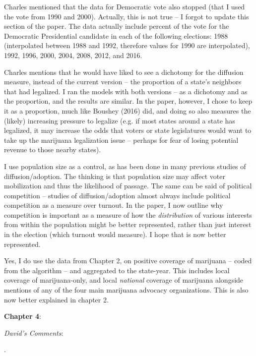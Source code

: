 \documentclass[12pt,stdletter,dateno,sigleft]{newlfm} %
\begin{document}
\begin{newlfm}
Charles mentioned that the data for Democratic vote also stopped (that I used the vote from 1990 and 2000). Actually, this is not true -- I forgot to update this section of the paper. The data actually include percent of the vote for the Democratic Presidential candidate in each of the following elections: 1988 (interpolated between 1988 and 1992, therefore values for 1990 are interpolated), 1992, 1996, 2000, 2004, 2008, 2012, and 2016. 

Charles mentions that he would have liked to see a dichotomy for the diffusion measure, instead of the current version -- the proportion of a state's neighbors that had legalized. I ran the models with both versions  -- as a dichotomy and as the proportion, and the results are similar. In the paper, however, I chose to keep it as a proportion, much like Boushey (2016) did, and doing so also measures the (likely) increasing pressure to legalize (e.g. if most states around a state has legalized, it may increase the odds that voters or state legislatures would want to take up the marijuana legalization issue -- perhaps for fear of losing potential revenue to those nearby states). 

I use population size as a control, as has been done in many previous studies of diffusion/adoption. The thinking is that population size may affect voter mobilization and thus the likelihood of passage. The same can be said of political competition -- studies of diffusion/adoption almost always include political competition as a measure over turnout. In the paper, I now outline why competition is important as a measure of how the \textit{distribution} of various interests from within the population might be better represented, rather than just interest in the election (which turnout would measure). I hope that is now better represented.

Yes, I do use the data from Chapter 2, on positive coverage of marijuana -- coded from the algorithm -- and aggregated to the state-year. This includes local coverage of marijuana-only, and local \textit{national} coverage of marijuana alongside mentions of any of the four main marijuana advocacy organizations. This is also now better explained in chapter 2. \newline



\textbf{Chapter 4}: 

\textit{David's Comments}:

.\newline


\end{newlfm}
\end{document}
